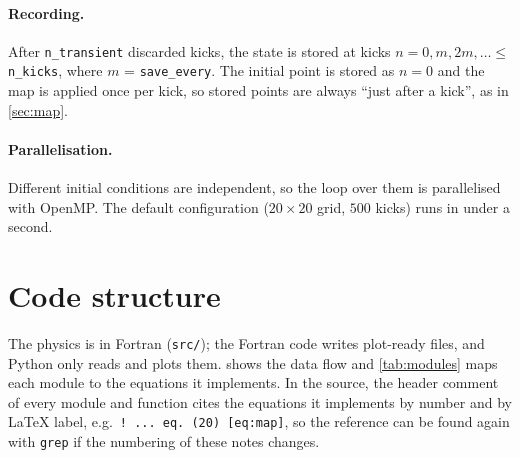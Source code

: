 \documentclass[11pt,a4paper]{article}
\begin{document}
\paragraph{Recording.} After \texttt{n\_transient} discarded kicks, the state is stored at kicks $n = 0, m, 2m,
\dots \le$ \texttt{n\_kicks}, where $m$ = \texttt{save\_every}. The initial point is stored as $n=0$ and
the map is applied once per kick, so stored points are always ``just after a kick'', as in \cref{sec:map}.

\paragraph{Parallelisation.} Different initial conditions are independent, so the loop over them is parallelised with
OpenMP. The default configuration ($20\times20$ grid, $500$ kicks) runs in under a second.

\section{Code structure}\label{sec:code}

The physics is in Fortran (\texttt{src/}); the Fortran code writes plot-ready files, and Python only reads and plots
them.  shows the data flow and \cref{tab:modules} maps each module to the equations it implements. In
the source, the header comment of every module and function cites the equations it implements by number and by
\LaTeX{} label, e.g.\ \texttt{! ... eq.~(20) [eq:map]}, so the reference can be found again with \texttt{grep} if the
numbering of these notes changes.
\end{document}
